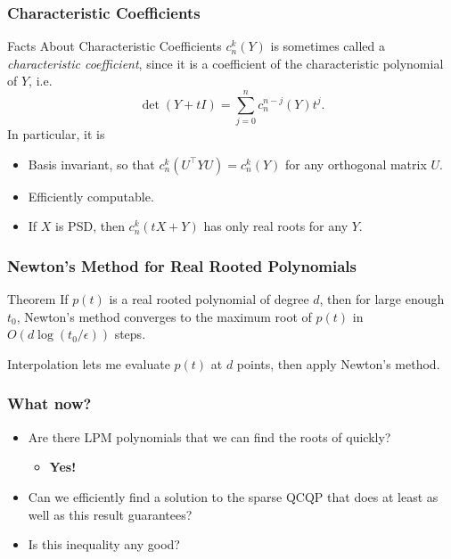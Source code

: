 \documentclass{beamer}
\begin{document}
\begin{frame}
    \frametitle{Characteristic Coefficients}
    \begin{block}{Facts About Characteristic Coefficients}
        $c_n^k(Y)$ is sometimes called a \emph{characteristic coefficient}, since it is a coefficient of the characteristic polynomial of $Y$, i.e.
        \[
            \det(Y + tI) = \sum_{j=0}^n c_n^{n-j}(Y) t^j.
        \]
        \pause
        In particular, it is
        \begin{itemize}
            \item Basis invariant, so that $c_n^k(U^{\intercal} Y U) = c_n^k(Y)$ for any orthogonal matrix $U$.
            \pause
            \item Efficiently computable.
            \pause
            \item If $X$ is PSD, then $c_n^k(tX+Y)$ has only real roots for any $Y$.
        \end{itemize}
    \end{block}
\end{frame}
\begin{frame}
    \frametitle{Newton's Method for Real Rooted Polynomials}
    \begin{block}{Theorem}
        If $p(t)$ is a real rooted polynomial of degree $d$, then for large enough $t_0$, Newton's method converges to the maximum root of $p(t)$ in $O(d \log(t_0 / \epsilon))$ steps.
    \end{block}
    Interpolation lets me evaluate $p(t)$ at $d$ points, then apply Newton's method.
\end{frame}
\begin{frame}
    \frametitle{What now?}
    \begin{itemize}
        \item Are there LPM polynomials that we can find the roots of quickly?
            \begin{itemize}
                \item \textbf{Yes!}
            \end{itemize}
        \item Can we efficiently find a solution to the sparse QCQP that does at least as well as this result guarantees?
        \item Is this inequality any good?
    \end{itemize}
\end{frame}
\end{document}
